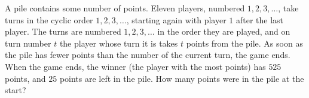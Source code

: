 A pile contains some number of points. Eleven players, numbered $1,2,3,\dots$, take turns in the cyclic order $1,2,3,\dots$, starting again with player $1$ after the last player. The turns are numbered $1,2,3,\dots$ in the order they are played, and on turn number $t$ the player whose turn it is takes $t$ points from the pile. As soon as the pile has fewer points than the number of the current turn, the game ends. When the game ends, the winner (the player with the most points) has $525$ points, and $25$ points are left in the pile. How many points were in the pile at the start?

